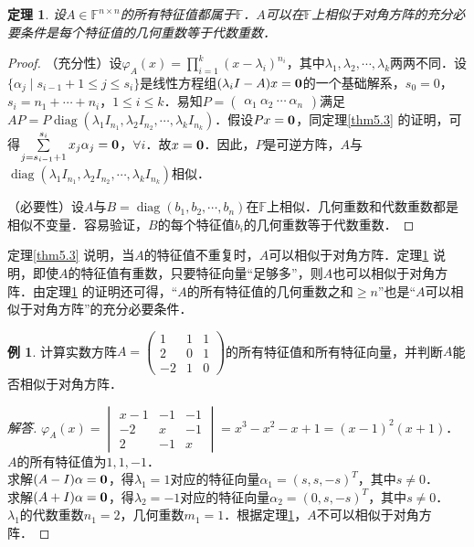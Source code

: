 \documentclass[a4paper,fontset=windows]{ctexbook}
\newtheorem{theorem}{定理}[chapter]
\theoremstyle{definition}
\newtheorem{example}{例}[chapter]
\DeclareMathOperator{\diag}{diag}
\renewcommand{\le}{\leqslant}
\renewcommand{\ge}{\geqslant}
\begin{document}
\begin{theorem}\label{thm5.4}
设$A\in\mathbb{F}^{n\times n}$的所有特征值都属于$\mathbb{F}$．$A$可以在$\mathbb{F}$上相似于对角方阵的充分必要条件是每个特征值的几何重数等于代数重数．
\end{theorem}

\begin{proof}
（充分性）设$\varphi_A(x)=\prod\limits_{i=1}^k(x-\lambda_i)^{n_i}$，其中$\lambda_1,\lambda_2,\cdots,\lambda_k$两两不同．设$\{\alpha_j\mid s_{i-1}+1\le j\le s_i\}$是线性方程组$(\lambda_iI-A)x={\bf 0}$的一个基础解系，$s_0=0$，$s_i=n_1+\cdots+n_i$，$1\le i\le k$．易知$P=\begin{pmatrix}\alpha_1~\alpha_2~\cdots~\alpha_n\end{pmatrix}$满足$AP=P\diag(\lambda_1I_{n_1},\lambda_2I_{n_2},\cdots,\lambda_kI_{n_k})$．假设$Px={\bf 0}$，同定理\ref{thm5.3} 的证明，可得$\sum\limits_{j=s_{i-1}+1}^{s_i}x_j\alpha_j={\bf 0}$，$\forall i$．故$x={\bf 0}$．因此，$P$是可逆方阵，$A$与$\diag(\lambda_1I_{n_1},\lambda_2I_{n_2},\cdots,\lambda_kI_{n_k})$相似．

（必要性）设$A$与$B=\diag(b_1,b_2,\cdots,b_n)$在$\mathbb{F}$上相似．几何重数和代数重数都是相似不变量．容易验证，$B$的每个特征值$b_i$的几何重数等于代数重数．
\end{proof}

定理\ref{thm5.3} 说明，当$A$的特征值不重复时，$A$可以相似于对角方阵．定理\ref{thm5.4} 说明，即使$A$的特征值有重数，只要特征向量“足够多”，则$A$也可以相似于对角方阵．由定理\ref{thm5.4} 的证明还可得，\linebreak“$A$的所有特征值的几何重数之和$\ge n$”也是“$A$可以相似于对角方阵”的充分必要条件．

\begin{example}
计算实数方阵$A=\begin{pmatrix}1&1&1 \\ 2&0&1 \\ -2&1&0\end{pmatrix}$的所有特征值和所有特征向量，并判断$A$能否相似于对角方阵．
\end{example}

\begin{proof}[解答]
$\varphi_A(x)=\begin{vmatrix}x-1&-1&-1 \\ -2&x&-1 \\ 2&-1&x\end{vmatrix}=x^3-x^2-x+1=(x-1)^2(x+1)$．$A$的所有特征值为$1,1,-1$．\\
求解$(A-I)\alpha={\bf 0}$，得$\lambda_1=1$对应的特征向量$\alpha_1=(s,s,-s)^T$，其中$s\ne 0$．\\
求解$(A+I)\alpha={\bf 0}$，得$\lambda_2=-1$对应的特征向量$\alpha_2=(0,s,-s)^T$，其中$s\ne 0$．\\
$\lambda_1$的代数重数$n_1=2$，几何重数$m_1=1$．根据定理\ref{thm5.4}，$A$不可以相似于对角方阵．
\end{proof}
\end{document}
